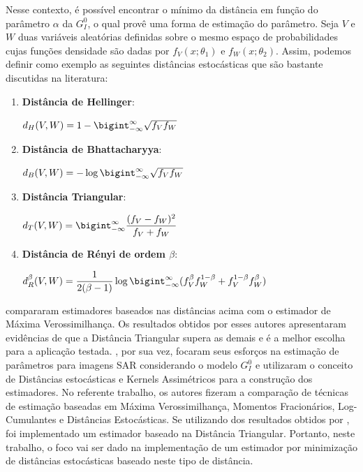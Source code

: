 \documentclass[12pt]{article}
\begin{document}
Nesse contexto, é possível encontrar o mínimo da distância em função do parâmetro $\alpha$ da $G_I^0$, o qual provê uma forma de estimação do parâmetro. Seja $V$ e $W$ duas variáveis aleatórias definidas sobre o mesmo espaço de probabilidades cujas funções densidade são dadas por $f_V(x; \theta_1)$ e $f_W(x; \theta_2)$. Assim, podemos definir como exemplo as seguintes distâncias estocásticas que são bastante discutidas na literatura:
\begin{enumerate}
    \item \textbf{Distância de Hellinger}: \begin{center} $d_H(V,W) = 1 - \bigint_{-\infty}^{\infty}\sqrt{f_V f_W}$ \end{center}
    \item \textbf{Distância de Bhattacharyya}: \begin{center} $d_B(V,W) = -\log\bigint_{-\infty}^{\infty}\sqrt{f_V f_W}$ \end{center}
    \item\textbf{ Distância Triangular}: \begin{center} $d_T(V,W) = \bigint_{-\infty}^{\infty}\dfrac{(f_V - f_W)^2}{f_V + f_W}$ \end{center}
    \item \textbf{Distância de Rényi de ordem $\beta$}: \begin{center} $d_R^\beta(V,W) = \dfrac{1}{2(\beta-1)}\log\bigint_{-\infty}^{\infty}(f_V^{\beta}f_W^{1-\beta} + f_V^{1-\beta}f_W^{\beta})$ \end{center}
\end{enumerate}

\citet{Cassetti2013} compararam estimadores baseados nas distâncias acima com o estimador de Máxima Verossimilhança. Os resultados obtidos por esses autores apresentaram evidências de que a Distância Triangular supera as demais e é a melhor escolha para a aplicação testada. \citet{FreryStochasticDistances2015}, por sua vez, focaram seus esforços na estimação de parâmetros para imagens SAR considerando o modelo $G_I^0$ e utilizaram o conceito de Distâncias estocásticas e Kernels Assimétricos para a construção dos estimadores. No referente trabalho, os autores fizeram a comparação de técnicas de estimação baseadas em Máxima Verossimilhança, Momentos Fracionários, Log-Cumulantes e Distâncias Estocásticas. Se utilizando dos resultados obtidos por \citet{Cassetti2013}, foi implementado um estimador baseado na Distância Triangular. Portanto, neste trabalho, o foco vai ser dado na implementação de um estimador por minimização de distâncias estocásticas baseado neste tipo de distância.
\end{document}
